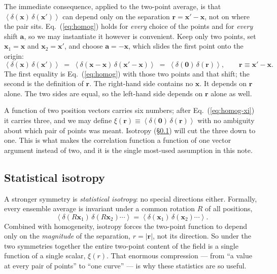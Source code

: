 \documentclass[12pt]{article}
\newcommand{\bx}{\mathbf{x}}
\newcommand{\ba}{\mathbf{a}}
\newcommand{\br}{\mathbf{r}}
\newcommand{\avg}[1]{\left\langle #1 \right\rangle}
\begin{document}
The immediate consequence, applied to the two-point average, is that
$\avg{\delta(\bx)\,\delta(\bx')}$ can depend only on the separation
$\br = \bx' - \bx$, not on where the pair sits.  Eq.~(\ref{eq:homog})
holds for \emph{every} choice of the points and for \emph{every} shift
$\ba$, so we may instantiate it however is convenient.  Keep only two
points, set $\bx_1 = \bx$ and $\bx_2 = \bx'$, and choose
$\ba = -\bx$, which slides the first point onto the origin:
\begin{equation}
  \avg{\delta(\bx)\,\delta(\bx')}
  \;=\; \avg{\delta(\bx - \bx)\,\delta(\bx' - \bx)}
  \;=\; \avg{\delta(\mathbf 0)\,\delta(\br)},
  \qquad \br \equiv \bx' - \bx .
  \label{eq:homog-xi}
\end{equation}
The first equality is Eq.~(\ref{eq:homog}) with those two points and that
shift; the second is the definition of $\br$.  The right-hand side
contains no $\bx$.  It depends on $\br$ alone.  The two sides are
equal, so the left-hand side depends on $\br$ alone as well.

A function of two position vectors carries six numbers; after
Eq.~(\ref{eq:homog-xi}) it carries three, and we may define
$\xi(\br) \equiv \avg{\delta(\mathbf 0)\,\delta(\br)}$ with no ambiguity
about which pair of points was meant.  Isotropy
(\S\ref{sec:isotropy}) will cut the three down to one.  This is what
makes the correlation function a function of one vector argument instead
of two, and it is the single most-used assumption in this note.

\subsection{Statistical isotropy}
\label{sec:isotropy}

A stronger symmetry is \emph{statistical isotropy}: no special
directions either.  Formally, every ensemble average is invariant under
a common rotation $R$ of all positions,
\begin{equation}
  \avg{\delta(R\bx_1)\,\delta(R\bx_2)\cdots}
  = \avg{\delta(\bx_1)\,\delta(\bx_2)\cdots}.
\end{equation}
Combined with homogeneity, isotropy forces the two-point function to
depend only on the \emph{magnitude} of the separation, $r = |\br|$, not
its direction.  So under the two symmetries together the entire
two-point content of the field is a single function of a single scalar,
$\xi(r)$.  That enormous compression --- from ``a value at every pair of
points'' to ``one curve'' --- is why these statistics are so useful.
\end{document}
